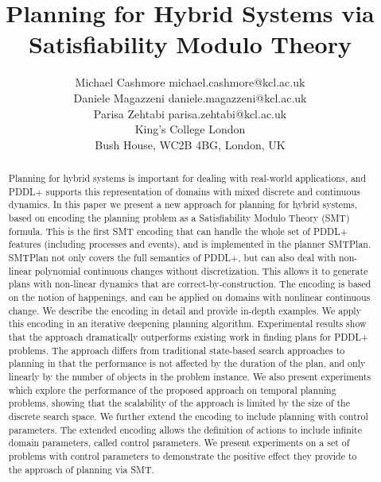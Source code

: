 \documentclass[letterpaper]{article}
\begin{document}
\title{Planning for Hybrid Systems via Satisfiability Modulo Theory}
\author{\name Michael Cashmore \email michael.cashmore@kcl.ac.uk \\
       \name Daniele Magazzeni \email daniele.magazzeni@kcl.ac.uk \\
       \name Parisa Zehtabi \email parisa.zehtabi@kcl.ac.uk \\
        \addr King's College London\\
        Bush House, WC2B 4BG, London, UK}

\maketitle


\begin{abstract}
Planning for hybrid systems is important for dealing with real-world applications, and PDDL+ supports this representation of domains with mixed discrete and continuous dynamics.
%
In this paper we present a new approach for planning for hybrid systems, based on encoding the planning problem as a Satisfiability Modulo Theory (SMT) formula.
This is the first SMT encoding that can handle the whole set of PDDL+ features (including processes and events), and is implemented in the planner SMTPlan. SMTPlan not only covers the full semantics of PDDL+, but can also deal with non-linear polynomial continuous changes without discretization. This allows it to generate plans with non-linear dynamics that are correct-by-construction.
The encoding is based on the notion of happenings, and can be applied on domains with nonlinear continuous change. We describe the encoding in detail and provide in-depth examples.
%
We apply this encoding in an iterative deepening planning algorithm.
%
Experimental results show that the approach dramatically outperforms existing work in finding plans for PDDL+ problems. The approach differs from traditional state-based search approaches to planning in that the performance is not affected by the duration of the plan, and only linearly by the number of objects in the problem instance.
%
We also present experiments which explore the performance of the proposed approach on temporal planning problems, showing that the scalability of the approach is limited by the size of the discrete search space.
%
We further extend the encoding to include planning with control parameters. The extended encoding allows the definition of actions to include infinite domain parameters, called control parameters. We present experiments on a set of problems with control parameters to demonstrate the positive effect they provide to the approach of planning via SMT.
\end{abstract}













\end{document}
